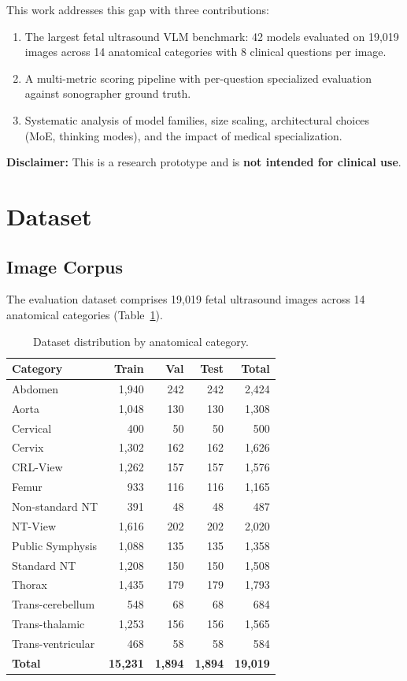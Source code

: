 \documentclass[11pt,a4paper]{article}
\begin{document}
This work addresses this gap with three contributions:
\begin{enumerate}
    \item The largest fetal ultrasound VLM benchmark: 42 models evaluated on 19,019 images across 14 anatomical categories with 8 clinical questions per image.
    \item A multi-metric scoring pipeline with per-question specialized evaluation against sonographer ground truth.
    \item Systematic analysis of model families, size scaling, architectural choices (MoE, thinking modes), and the impact of medical specialization.
\end{enumerate}

\textbf{Disclaimer:} This is a research prototype and is \textbf{not intended for clinical use}.

\section{Dataset}

\subsection{Image Corpus}

The evaluation dataset comprises 19,019 fetal ultrasound images across 14 anatomical categories (Table~\ref{tab:dataset}).

\begin{table}[H]
\centering
\caption{Dataset distribution by anatomical category.}
\label{tab:dataset}
\begin{tabular}{lrrrr}
\toprule
\textbf{Category} & \textbf{Train} & \textbf{Val} & \textbf{Test} & \textbf{Total} \\
\midrule
Abdomen & 1,940 & 242 & 242 & 2,424 \\
Aorta & 1,048 & 130 & 130 & 1,308 \\
Cervical & 400 & 50 & 50 & 500 \\
Cervix & 1,302 & 162 & 162 & 1,626 \\
CRL-View & 1,262 & 157 & 157 & 1,576 \\
Femur & 933 & 116 & 116 & 1,165 \\
Non-standard NT & 391 & 48 & 48 & 487 \\
NT-View & 1,616 & 202 & 202 & 2,020 \\
Public Symphysis & 1,088 & 135 & 135 & 1,358 \\
Standard NT & 1,208 & 150 & 150 & 1,508 \\
Thorax & 1,435 & 179 & 179 & 1,793 \\
Trans-cerebellum & 548 & 68 & 68 & 684 \\
Trans-thalamic & 1,253 & 156 & 156 & 1,565 \\
Trans-ventricular & 468 & 58 & 58 & 584 \\
\midrule
\textbf{Total} & \textbf{15,231} & \textbf{1,894} & \textbf{1,894} & \textbf{19,019} \\
\bottomrule
\end{tabular}
\end{table}
\end{document}
